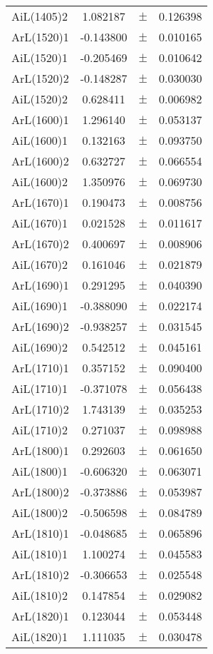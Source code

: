 \begin{table}
\begin{tiny}
\begin{tabular}{lccc}
AiL(1405)2 & 1.082187 & $\pm$ & 0.126398 \\
ArL(1520)1 & -0.143800 & $\pm$ & 0.010165 \\
AiL(1520)1 & -0.205469 & $\pm$ & 0.010642 \\
ArL(1520)2 & -0.148287 & $\pm$ & 0.030030 \\
AiL(1520)2 & 0.628411 & $\pm$ & 0.006982 \\
ArL(1600)1 & 1.296140 & $\pm$ & 0.053137 \\
AiL(1600)1 & 0.132163 & $\pm$ & 0.093750 \\
ArL(1600)2 & 0.632727 & $\pm$ & 0.066554 \\
AiL(1600)2 & 1.350976 & $\pm$ & 0.069730 \\
ArL(1670)1 & 0.190473 & $\pm$ & 0.008756 \\
AiL(1670)1 & 0.021528 & $\pm$ & 0.011617 \\
ArL(1670)2 & 0.400697 & $\pm$ & 0.008906 \\
AiL(1670)2 & 0.161046 & $\pm$ & 0.021879 \\
ArL(1690)1 & 0.291295 & $\pm$ & 0.040390 \\
AiL(1690)1 & -0.388090 & $\pm$ & 0.022174 \\
ArL(1690)2 & -0.938257 & $\pm$ & 0.031545 \\
AiL(1690)2 & 0.542512 & $\pm$ & 0.045161 \\
ArL(1710)1 & 0.357152 & $\pm$ & 0.090400 \\
AiL(1710)1 & -0.371078 & $\pm$ & 0.056438 \\
ArL(1710)2 & 1.743139 & $\pm$ & 0.035253 \\
AiL(1710)2 & 0.271037 & $\pm$ & 0.098988 \\
ArL(1800)1 & 0.292603 & $\pm$ & 0.061650 \\
AiL(1800)1 & -0.606320 & $\pm$ & 0.063071 \\
ArL(1800)2 & -0.373886 & $\pm$ & 0.053987 \\
AiL(1800)2 & -0.506598 & $\pm$ & 0.084789 \\
ArL(1810)1 & -0.048685 & $\pm$ & 0.065896 \\
AiL(1810)1 & 1.100274 & $\pm$ & 0.045583 \\
ArL(1810)2 & -0.306653 & $\pm$ & 0.025548 \\
AiL(1810)2 & 0.147854 & $\pm$ & 0.029082 \\
ArL(1820)1 & 0.123044 & $\pm$ & 0.053448 \\
AiL(1820)1 & 1.111035 & $\pm$ & 0.030478 \\

\end{tabular}
\end{tiny}
\end{table}
